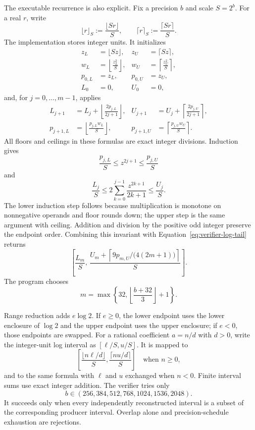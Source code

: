 \documentclass[11pt]{article}
\theoremstyle{definition}
\begin{document}
The executable recurrence is also explicit.  Fix a precision $b$ and scale $S=2^b$.  For a real
$r$, write
\[
  \lfloor r\rfloor_S:=\frac{\lfloor Sr\rfloor}{S},
  \qquad
  \lceil r\rceil_S:=\frac{\lceil Sr\rceil}{S}.
\]
The implementation stores integer units.  It initializes
\begin{align}
  z_L&=\lfloor Sz\rfloor,&z_U&=\lceil Sz\rceil,\\
  w_L&=\left\lfloor\frac{z_L^2}{S}\right\rfloor,&
  w_U&=\left\lceil\frac{z_U^2}{S}\right\rceil,\\
  p_{0,L}&=z_L,&p_{0,U}&=z_U,\\
  L_0&=0,&U_0&=0,
\end{align}
and, for $j=0,\ldots,m-1$, applies
\begin{align}
  L_{j+1}
    &=L_j+\left\lfloor\frac{2p_{j,L}}{2j+1}\right\rfloor,&
  U_{j+1}
    &=U_j+\left\lceil\frac{2p_{j,U}}{2j+1}\right\rceil,\\
  p_{j+1,L}
    &=\left\lfloor\frac{p_{j,L}w_L}{S}\right\rfloor,&
  p_{j+1,U}
    &=\left\lceil\frac{p_{j,U}w_U}{S}\right\rceil.
  \label{eq:verifier-fixed-recurrence}
\end{align}
All floors and ceilings in these formulas are exact integer divisions.  Induction gives
\[
  \frac{p_{j,L}}{S}\le z^{2j+1}\le\frac{p_{j,U}}{S}
\]
and
\[
  \frac{L_j}{S}
  \le
  2\sum_{k=0}^{j-1}\frac{z^{2k+1}}{2k+1}
  \le
  \frac{U_j}{S}.
\]
The lower induction step follows because multiplication is monotone on nonnegative operands and
floor rounds down; the upper step is the same argument with ceiling.  Addition and division by the
positive odd integer preserve the endpoint order.  Combining this invariant with
Equation~\eqref{eq:verifier-log-tail} returns
\begin{equation}
  \left[
    \frac{L_m}{S},\,
    \frac{U_m+
      \left\lceil 9p_{m,U}/\bigl(4(2m+1)\bigr)\right\rceil}{S}
  \right].
  \label{eq:verifier-fixed-log-interval}
\end{equation}
The program chooses
\[
  m=\max\!\left\{32,\left\lfloor\frac{b+32}{3}\right\rfloor+1\right\}.
\]

Range reduction adds $e\log2$.  If $e\ge0$, the lower endpoint uses the lower enclosure of
$\log2$ and the upper endpoint uses the upper enclosure; if $e<0$, those endpoints are swapped.
For a rational coefficient $a=n/d$ with $d>0$, write the integer-unit log interval as
$[\ell/S,u/S]$.  It is mapped to
\[
  \left[
    \frac{\lfloor n\ell/d\rfloor}{S},
    \frac{\lceil nu/d\rceil}{S}
  \right]
  \quad\text{when }n\ge0,
\]
and to the same formula with $\ell$ and $u$ exchanged when $n<0$.  Finite interval sums use exact
integer addition.  The verifier tries only
\[
  b\in(256,384,512,768,1024,1536,2048).
\]
It succeeds only when every independently reconstructed interval is a subset of the corresponding
producer interval.  Overlap alone and precision-schedule exhaustion are rejections.
\end{document}
